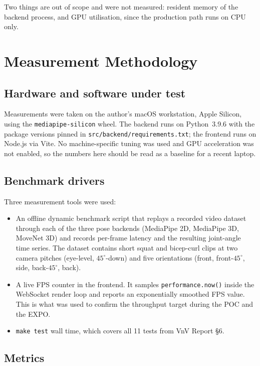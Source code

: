 \documentclass{article}
\begin{document}
Two things are out of scope and were not measured: resident memory of
the backend process, and GPU utilisation, since the production path
runs on CPU only.

\section{Measurement Methodology}

\subsection{Hardware and software under test}

Measurements were taken on the author's macOS workstation, Apple
Silicon, using the \texttt{mediapipe-silicon} wheel. The backend runs
on Python~3.9.6 with the package versions pinned in
\texttt{src/backend/requirements.txt}; the frontend runs on Node.js
via Vite. No machine-specific tuning was used and GPU acceleration was
not enabled, so the numbers here should be read as a baseline for a
recent laptop.

\subsection{Benchmark drivers}

Three measurement tools were used:

\begin{itemize}
  \item An offline dynamic benchmark script that replays a recorded
    video dataset through each of the three pose backends (MediaPipe
    2D, MediaPipe 3D, MoveNet 3D) and records per-frame latency and
    the resulting joint-angle time series. The dataset contains short
    squat and bicep-curl clips at two camera pitches (eye-level,
    $45^{\circ}$-down) and five orientations (front, front-$45^{\circ}$,
    side, back-$45^{\circ}$, back).
  \item A live FPS counter in the frontend. It samples
    \texttt{performance.now()} inside the WebSocket render loop and
    reports an exponentially smoothed FPS value. This is what was used
    to confirm the throughput target during the POC and the EXPO.
  \item \texttt{make test} wall time, which covers all 11 tests from
    VnV Report \S6.
\end{itemize}

\subsection{Metrics}
\end{document}

